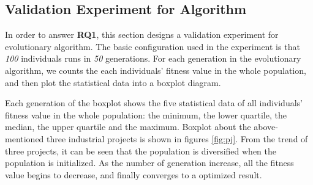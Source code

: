 \subsection{Validation Experiment for Algorithm}
%
In order to answer \textbf{RQ1}, this section designs a validation experiment
for evolutionary algorithm. The basic configuration used in the experiment is
that \emph{100} individuals runs in \emph{50} generations. For each generation
in the evolutionary algorithm, we counts the each individuals' fitness value in
the whole population, and then plot the statistical data into a boxplot diagram.


Each generation of the boxplot shows the five statistical data of all
individuals' fitness value in the whole population: the minimum, the lower
quartile, the median, the upper quartile and the maximum. Boxplot about the
above-mentioned three industrial projects is shown in figures \ref{fig:pj}. From
the trend of three projects, it can be seen that the population is diversified
when the population is initialized. As the number of generation increase, all
the fitness value begins to decrease, and finally converges to a optimized
result.

